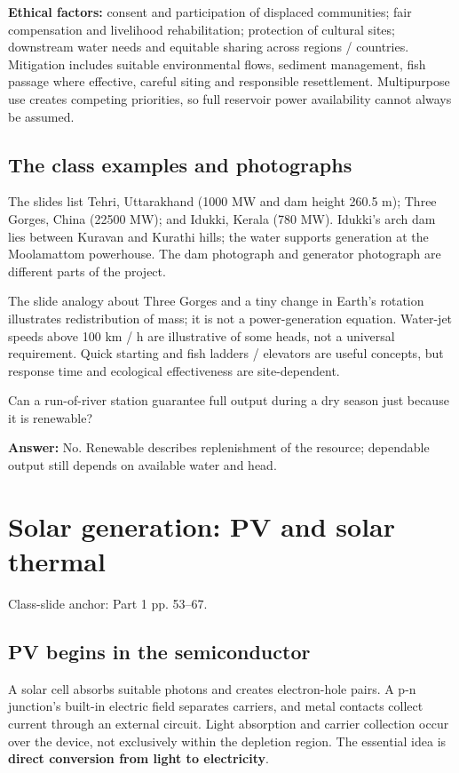 \documentclass[11pt,a4paper]{article}
\newcommand{\slides}[1]{{\small\color{muted}\textsf{Class-slide anchor: #1.}}\par}
\newcommand{\chapterstart}[2]{\clearpage\section{#1}\label{#2}}
\newcommand{\checkq}[2]{\begin{tcolorbox}[breakable=false,colback=pale,colframe=teal,coltitle=white,title={Check your understanding}]#1\par\textbf{Answer:} #2\end{tcolorbox}}
\begin{document}
\textbf{Ethical factors:} consent and participation of displaced communities; fair compensation and livelihood rehabilitation; protection of cultural sites; downstream water needs and equitable sharing across regions / countries. Mitigation includes suitable environmental flows, sediment management, fish passage where effective, careful siting and responsible resettlement. Multipurpose use creates competing priorities, so full reservoir power availability cannot always be assumed.

\subsection{The class examples and photographs}
The slides list Tehri, Uttarakhand (1000 MW and dam height 260.5 m); Three Gorges, China (22500 MW); and Idukki, Kerala (780 MW). Idukki's arch dam lies between Kuravan and Kurathi hills; the water supports generation at the Moolamattom powerhouse. The dam photograph and generator photograph are different parts of the project.

The slide analogy about Three Gorges and a tiny change in Earth's rotation illustrates redistribution of mass; it is not a power-generation equation. Water-jet speeds above 100 km / h are illustrative of some heads, not a universal requirement. Quick starting and fish ladders / elevators are useful concepts, but response time and ecological effectiveness are site-dependent.
\checkq{Can a run-of-river station guarantee full output during a dry season just because it is renewable?}{No. Renewable describes replenishment of the resource; dependable output still depends on available water and head.}

\chapterstart{Solar generation: PV and solar thermal}{solar}
\slides{Part 1 pp. 53--67}
\subsection{PV begins in the semiconductor}
A solar cell absorbs suitable photons and creates electron-hole pairs. A p-n junction's built-in electric field separates carriers, and metal contacts collect current through an external circuit. Light absorption and carrier collection occur over the device, not exclusively within the depletion region. The essential idea is \textbf{direct conversion from light to electricity}.
\end{document}

